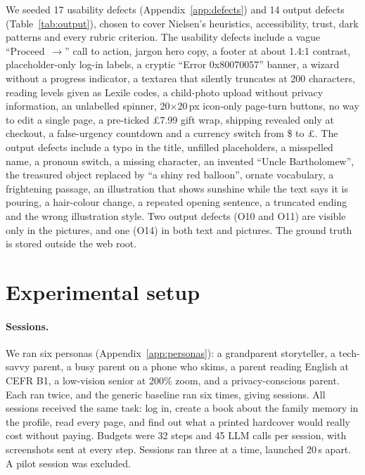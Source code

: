 \documentclass[10pt,twocolumn]{article}
\begin{document}
We seeded 17 usability defects (Appendix~\ref{app:defects}) and 14 output defects (Table~\ref{tab:output}), chosen to cover Nielsen's heuristics, accessibility, trust, dark patterns and every rubric criterion. The usability defects include a vague ``Proceed~$\to$'' call to action, jargon hero copy, a footer at about 1.4:1 contrast, placeholder-only log-in labels, a cryptic ``Error 0x80070057'' banner, a wizard without a progress indicator, a textarea that silently truncates at 200 characters, reading levels given as Lexile codes, a child-photo upload without privacy information, an unlabelled spinner, 20$\times$20\,px icon-only page-turn buttons, no way to edit a single page, a pre-ticked \pounds7.99 gift wrap, shipping revealed only at checkout, a false-urgency countdown and a currency switch from \$ to \pounds. The output defects include a typo in the title, unfilled placeholders, a misspelled name, a pronoun switch, a missing character, an invented ``Uncle Bartholomew'', the treasured object replaced by ``a shiny red balloon'', ornate vocabulary, a frightening passage, an illustration that shows sunshine while the text says it is pouring, a hair-colour change, a repeated opening sentence, a truncated ending and the wrong illustration style. Two output defects (O10 and O11) are visible only in the pictures, and one (O14) in both text and pictures. The ground truth is stored outside the web root.

\section{Experimental setup}
\label{sec:setup}

\paragraph{Sessions.} We ran six personas (Appendix~\ref{app:personas}): a grandparent storyteller, a tech-savvy parent, a busy parent on a phone who skims, a parent reading English at CEFR B1, a low-vision senior at 200\% zoom, and a privacy-conscious parent. Each ran twice, and the generic baseline ran six times, giving \NRuns{} sessions. All sessions received the same task: log in, create a book about the family memory in the profile, read every page, and find out what a printed hardcover would really cost without paying. Budgets were 32 steps and 45 LLM calls per session, with screenshots sent at every step. Sessions ran three at a time, launched 20\,s apart. A pilot session was excluded.
\end{document}

